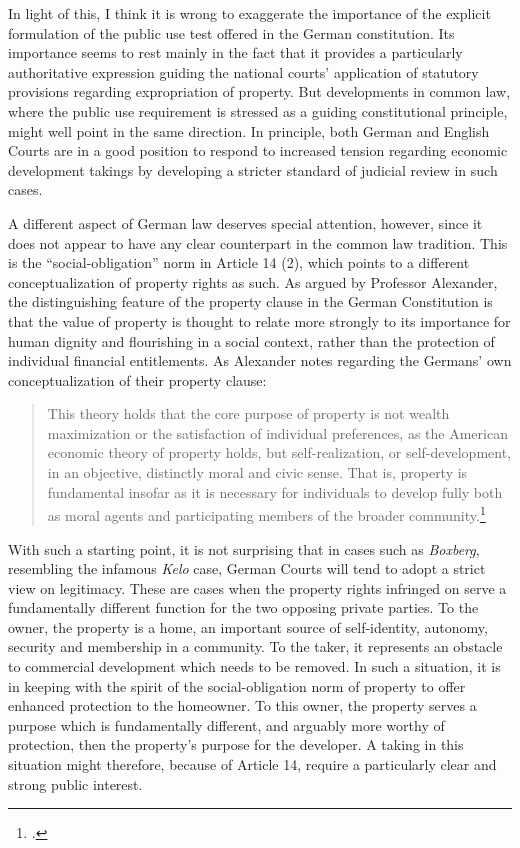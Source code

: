 In light of this, I think it is wrong to exaggerate the importance of the explicit formulation of the public use test offered in the German constitution. Its importance seems to rest mainly in the fact that it provides a particularly authoritative expression guiding the national courts' application of statutory provisions regarding expropriation of property. But developments in common law, where the public use requirement is stressed as a guiding constitutional principle, might well point in the same direction. In principle, both German and English Courts are in a good position to respond to increased tension regarding economic development takings by developing a stricter standard of judicial review in such cases.

A different aspect of German law deserves special attention, however, since it does not appear to have any clear counterpart in the common law tradition. This is the  ``social-obligation'' norm in Article 14 (2), which points to a different conceptualization of property rights as such. As argued by Professor Alexander, the distinguishing feature of the property clause in the German Constitution is that the value of property is thought to relate more strongly to its importance for human dignity and flourishing in a social context, rather than the protection of individual financial entitlements. As Alexander notes regarding the Germans' own conceptualization of their property clause:

\begin{quote}
This theory holds that the core purpose of property is not
wealth maximization or the satisfaction of individual preferences, as the American
economic theory of property holds, but self-realization, or self-development,
in an objective, distinctly moral and civic sense. That is, property is fundamental insofar as it is necessary for individuals to develop fully both
as moral agents and participating members of the broader community.\footcite[745]{alexander03}
\end{quote}

With such a starting point, it is not surprising that in cases such as {\it Boxberg}, resembling the infamous {\it Kelo} case, German Courts will tend to adopt a strict view on legitimacy. These are cases when the property rights infringed on serve a fundamentally different function for the two opposing private parties. To the owner, the property is a home, an important source of self-identity, autonomy, security and membership in a community. To the taker, it represents an obstacle to commercial development which needs to be removed. In such a situation, it is in keeping with the spirit of the social-obligation norm of property to offer enhanced protection to the homeowner. To this owner, the property serves a purpose which is fundamentally different, and arguably more worthy of protection, then the property's purpose for the developer. A taking in this situation might therefore, because of Article 14, require a particularly clear and strong public interest.

